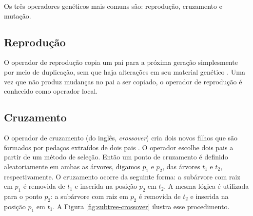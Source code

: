 Os três operadores genéticos mais comuns são: reprodução, cruzamento e mutação.

\subsection{Reprodução}
O operador de reprodução copia um pai para a próxima geração simplesmente por meio de duplicação, sem que haja alterações em seu material genético \cite{poli2008,banzhaf1998,koza1992}. Uma vez que não produz mudanças no pai a ser copiado, o operador de reprodução é conhecido como operador local.

\subsection{Cruzamento}
O operador de cruzamento (do inglês, \textit{crossover}) cria dois novos filhos que são formados por pedaços extraídos de dois pais \cite{poli2008,banzhaf1998,koza1992}. O operador escolhe dois pais a partir de um método de seleção. Então um ponto de cruzamento é definido aleatoriamente em ambas as árvores, digamos $p_1$ e $p_2$, das árvores $t_1$ e $t_2$, respectivamente. O cruzamento ocorre da seguinte forma: a subárvore com raiz em $p_1$ é removida de $t_1$ e inserida na posição $p_2$ em $t_2$. A mesma lógica é utilizada para o ponto $p_2$: a subárvore com raiz em $p_2$ é removida de $t_2$ e inserida na posição $p_1$ em $t_1$. A Figura \ref{fig:subtree-crossover} ilustra esse procedimento.

